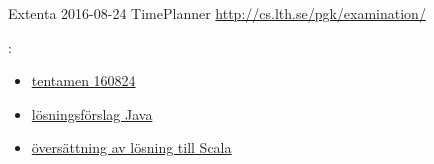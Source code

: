 \begin{Slide}{Extenta 2016-08-24 TimePlanner}\SlideFontSmall
\url{http://cs.lth.se/pgk/examination/}

\vspace{1em}: 
\begin{itemize}
\item \href{http://fileadmin.cs.lth.se/cs//Education/grundkurs/extentor/160824.pdf}{tentamen 160824} 
\item \href{http://fileadmin.cs.lth.se/cs//Education/grundkurs/extentor/sol-160824.pdf}{lösningsförslag Java} 
\item \href{https://github.com/lunduniversity/introprog/tree/master/compendium/examples/exam/re-impl-java-exams/timeplanner-160824}{översättning av lösning till Scala}
\end{itemize}
\end{Slide}


